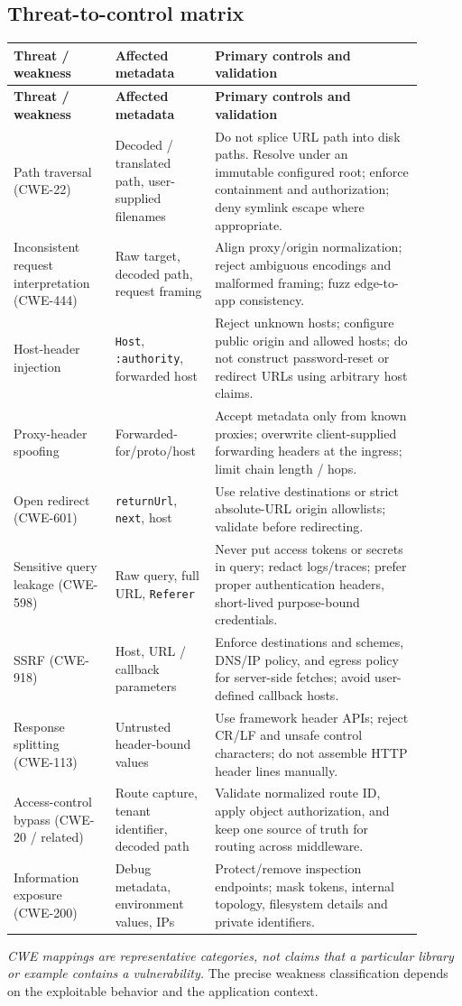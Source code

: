 \documentclass[10pt,letterpaper,oneside]{article}
\newcommand{\code}[1]{\texttt{#1}}
\begin{document}
\subsection{Threat-to-control matrix}
\footnotesize
\begin{longtable}{P{0.23\linewidth}P{0.20\linewidth}P{0.47\linewidth}}
\toprule
\textbf{Threat / weakness} & \textbf{Affected metadata} & \textbf{Primary controls and validation}\\\midrule\endfirsthead
\toprule\textbf{Threat / weakness} & \textbf{Affected metadata} & \textbf{Primary controls and validation}\\\midrule\endhead
Path traversal (CWE-22) & Decoded / translated path, user-supplied filenames & Do not splice URL path into disk paths. Resolve under an immutable configured root; enforce containment and authorization; deny symlink escape where appropriate.\\
Inconsistent request interpretation (CWE-444) & Raw target, decoded path, request framing & Align proxy/origin normalization; reject ambiguous encodings and malformed framing; fuzz edge-to-app consistency.\\
Host-header injection & \code{Host}, \code{:authority}, forwarded host & Reject unknown hosts; configure public origin and allowed hosts; do not construct password-reset or redirect URLs using arbitrary host claims.\\
Proxy-header spoofing & Forwarded-for/proto/host & Accept metadata only from known proxies; overwrite client-supplied forwarding headers at the ingress; limit chain length / hops.\\
Open redirect (CWE-601) & \code{returnUrl}, \code{next}, host & Use relative destinations or strict absolute-URL origin allowlists; validate before redirecting.\\
Sensitive query leakage (CWE-598) & Raw query, full URL, \code{Referer} & Never put access tokens or secrets in query; redact logs/traces; prefer proper authentication headers, short-lived purpose-bound credentials.\\
SSRF (CWE-918) & Host, URL / callback parameters & Enforce destinations and schemes, DNS/IP policy, and egress policy for server-side fetches; avoid user-defined callback hosts.\\
Response splitting (CWE-113) & Untrusted header-bound values & Use framework header APIs; reject CR/LF and unsafe control characters; do not assemble HTTP header lines manually.\\
Access-control bypass (CWE-20 / related) & Route capture, tenant identifier, decoded path & Validate normalized route ID, apply object authorization, and keep one source of truth for routing across middleware.\\
Information exposure (CWE-200) & Debug metadata, environment values, IPs & Protect/remove inspection endpoints; mask tokens, internal topology, filesystem details and private identifiers.\\
\bottomrule
\end{longtable}
\normalsize
\emph{CWE mappings are representative categories, not claims that a particular library or example contains a vulnerability.} The precise weakness classification depends on the exploitable behavior and the application context.
\end{document}
